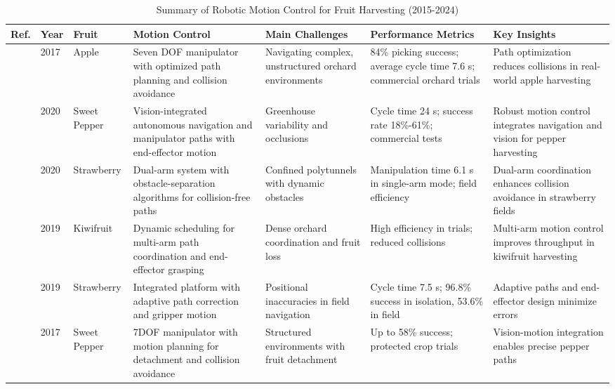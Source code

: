 \documentclass[pdflatex,sn-mathphys-num]{sn-jnl}
\begin{document}
\begin{table}[htbp]
\centering
\small
\caption{Summary of Robotic Motion Control for Fruit Harvesting (2015-2024)}
\label{tab:motion-control-based}
\renewcommand{\arraystretch}{1.3}
\begin{tabular}{p{1.2cm}p{0.8cm}p{1.5cm}p{3cm}p{2.5cm}p{3cm}p{3.5cm}}
\toprule
\textbf{Ref.} & \textbf{Year} & \textbf{Fruit} & \textbf{Motion Control} & \textbf{Main Challenges} & \textbf{Performance Metrics} & \textbf{Key Insights} \\ \midrule
\cite{silwal2017design} & 2017 & Apple & Seven DOF manipulator with optimized path planning and collision avoidance & Navigating complex, unstructured orchard environments & 84\% picking success; average cycle time 7.6 s; commercial orchard trials & Path optimization reduces collisions in real-world apple harvesting \\ \midrule
\cite{arad2020development} & 2020 & Sweet Pepper & Vision-integrated autonomous navigation and manipulator paths with end-effector motion & Greenhouse variability and occlusions & Cycle time 24 s; success rate 18\%-61\%; commercial tests & Robust motion control integrates navigation and vision for pepper harvesting \\ \midrule
\cite{xiong2020autonomous} & 2020 & Strawberry & Dual-arm system with obstacle-separation algorithms for collision-free paths & Confined polytunnels with dynamic obstacles & Manipulation time 6.1 s in single-arm mode; field efficiency & Dual-arm coordination enhances collision avoidance in strawberry fields \\ \midrule
\cite{williams2019robotic} & 2019 & Kiwifruit & Dynamic scheduling for multi-arm path coordination and end-effector grasping & Dense orchard coordination and fruit loss & High efficiency in trials; reduced collisions & Multi-arm motion control improves throughput in kiwifruit harvesting \\ \midrule
\cite{xiong2019development} & 2019 & Strawberry & Integrated platform with adaptive path correction and gripper motion & Positional inaccuracies in field navigation & Cycle time 7.5 s; 96.8\% success in isolation, 53.6\% in field & Adaptive paths and end-effector design minimize errors \\ \midrule
\cite{lehnert2017autonomous} & 2017 & Sweet Pepper & 7DOF manipulator with motion planning for detachment and collision avoidance & Structured environments with fruit detachment & Up to 58\% success; protected crop trials & Vision-motion integration enables precise pepper paths \\ \midrule

\end{tabular}
\end{table}
\end{document}

